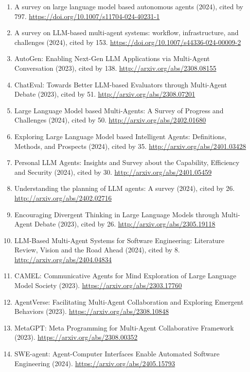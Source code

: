 \documentclass[11pt]{article}
\begin{document}
\begin{enumerate}
\def\labelenumi{\arabic{enumi}.}
\tightlist
\item
  A survey on large language model based autonomous agents (2024), cited
  by 797. \url{https://doi.org/10.1007/s11704-024-40231-1}
\item
  A survey on LLM-based multi-agent systems: workflow, infrastructure,
  and challenges (2024), cited by 153.
  \url{https://doi.org/10.1007/s44336-024-00009-2}
\item
  AutoGen: Enabling Next-Gen LLM Applications via Multi-Agent
  Conversation (2023), cited by 138.
  \url{http://arxiv.org/abs/2308.08155}
\item
  ChatEval: Towards Better LLM-based Evaluators through Multi-Agent
  Debate (2023), cited by 51. \url{http://arxiv.org/abs/2308.07201}
\item
  Large Language Model based Multi-Agents: A Survey of Progress and
  Challenges (2024), cited by 50. \url{http://arxiv.org/abs/2402.01680}
\item
  Exploring Large Language Model based Intelligent Agents: Definitions,
  Methods, and Prospects (2024), cited by 35.
  \url{http://arxiv.org/abs/2401.03428}
\item
  Personal LLM Agents: Insights and Survey about the Capability,
  Efficiency and Security (2024), cited by 30.
  \url{http://arxiv.org/abs/2401.05459}
\item
  Understanding the planning of LLM agents: A survey (2024), cited by
  26. \url{http://arxiv.org/abs/2402.02716}
\item
  Encouraging Divergent Thinking in Large Language Models through
  Multi-Agent Debate (2023), cited by 26.
  \url{http://arxiv.org/abs/2305.19118}
\item
  LLM-Based Multi-Agent Systems for Software Engineering: Literature
  Review, Vision and the Road Ahead (2024), cited by 8.
  \url{http://arxiv.org/abs/2404.04834}
\item
  CAMEL: Communicative Agents for Mind Exploration of Large Language
  Model Society (2023). \url{https://arxiv.org/abs/2303.17760}
\item
  AgentVerse: Facilitating Multi-Agent Collaboration and Exploring
  Emergent Behaviors (2023). \url{https://arxiv.org/abs/2308.10848}
\item
  MetaGPT: Meta Programming for Multi-Agent Collaborative Framework
  (2023). \url{https://arxiv.org/abs/2308.00352}
\item
  SWE-agent: Agent-Computer Interfaces Enable Automated Software
  Engineering (2024). \url{https://arxiv.org/abs/2405.15793}
\end{enumerate}
\end{document}

